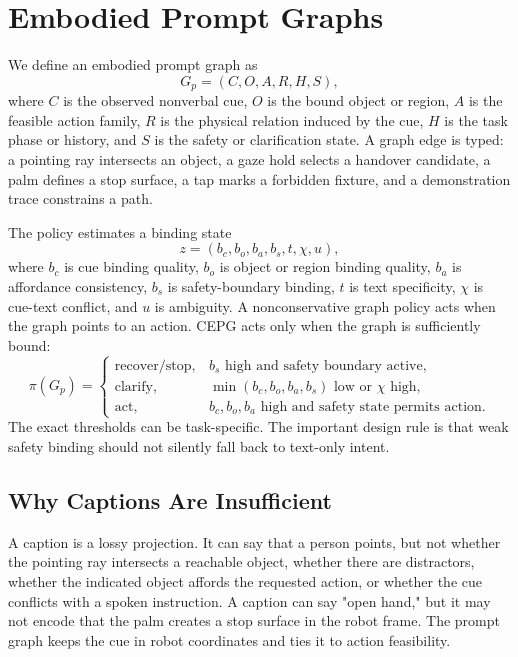 \documentclass{article}
\newcommand{\method}{CEPG}
\begin{document}
\section{Embodied Prompt Graphs}

We define an embodied prompt graph as
\[
G_p = (C, O, A, R, H, S),
\]
where $C$ is the observed nonverbal cue, $O$ is the bound object or region, $A$ is the feasible action family, $R$ is the physical relation induced by the cue, $H$ is the task phase or history, and $S$ is the safety or clarification state. A graph edge is typed: a pointing ray intersects an object, a gaze hold selects a handover candidate, a palm defines a stop surface, a tap marks a forbidden fixture, and a demonstration trace constrains a path.

The policy estimates a binding state
\[
z = (b_c, b_o, b_a, b_s, t, \chi, u),
\]
where $b_c$ is cue binding quality, $b_o$ is object or region binding quality, $b_a$ is affordance consistency, $b_s$ is safety-boundary binding, $t$ is text specificity, $\chi$ is cue-text conflict, and $u$ is ambiguity. A nonconservative graph policy acts when the graph points to an action. \method{} acts only when the graph is sufficiently bound:
\[
\pi(G_p) =
\begin{cases}
\mathrm{recover/stop}, & b_s \text{ high and safety boundary active},\\
\mathrm{clarify}, & \min(b_c,b_o,b_a,b_s) \text{ low or } \chi \text{ high},\\
\mathrm{act}, & b_c,b_o,b_a \text{ high and safety state permits action}.
\end{cases}
\]
The exact thresholds can be task-specific. The important design rule is that weak safety binding should not silently fall back to text-only intent.

\subsection{Why Captions Are Insufficient}

A caption is a lossy projection. It can say that a person points, but not whether the pointing ray intersects a reachable object, whether there are distractors, whether the indicated object affords the requested action, or whether the cue conflicts with a spoken instruction. A caption can say "open hand," but it may not encode that the palm creates a stop surface in the robot frame. The prompt graph keeps the cue in robot coordinates and ties it to action feasibility.
\end{document}
